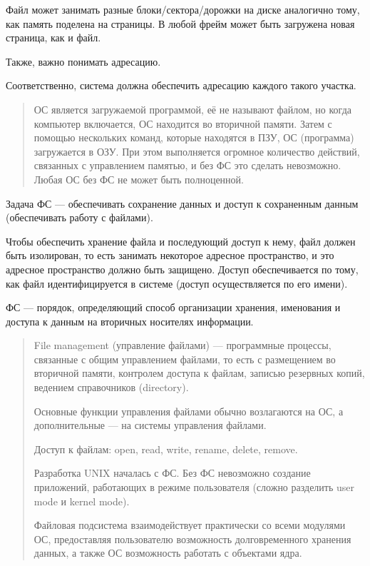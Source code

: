 Файл может занимать разные блоки/сектора/дорожки на диске аналогично тому, как память поделена на страницы. В любой фрейм может быть загружена новая страница, как и файл. 

Также, важно понимать адресацию. 

Соответственно, система должна обеспечить адресацию каждого такого участка.

\begin{quote}
	ОС является загружаемой программой, её не называют файлом, но когда компьютер включается, ОС находится во вторичной памяти. Затем с помощью нескольких команд, которые находятся в ПЗУ, ОС (программа) загружается в ОЗУ. При этом выполняется огромное количество действий, связанных с управлением памятью, и без ФС это сделать невозможно. Любая ОС без ФС не может быть полноценной.
\end{quote}

Задача ФС --- обеспечивать сохранение данных и доступ к сохраненным данным (обеспечивать работу с файлами).

Чтобы обеспечить хранение файла и последующий доступ к нему, файл должен быть изолирован, то есть занимать некоторое адресное пространство, и это адресное пространство должно быть защищено. Доступ обеспечивается по тому, как файл идентифицируется в системе (доступ осуществляется по его имени).

ФС --- порядок, определяющий способ организации хранения, именования и доступа к данным на вторичных носителях информации.

\begin{quote}
	File management (управление файлами) --- программные процессы, связанные с общим управлением файлами, то есть с размещением во вторичной памяти, контролем доступа к файлам, записью резервных копий, ведением справочников (directory).
	
	Основные функции управления файлами обычно возлагаются на ОС, а дополнительные --- на системы управления файлами.
	
	Доступ к файлам: open, read, write, rename, delete, remove.
	
	Разработка UNIX началась с ФС. Без ФС невозможно создание приложений, работающих в режиме пользователя (сложно разделить user mode и kernel mode).
	
	Файловая подсистема взаимодействует практически со всеми модулями ОС, предоставляя пользователю возможность долговременного хранения данных, а также ОС возможность работать с объектами ядра.
\end{quote}

